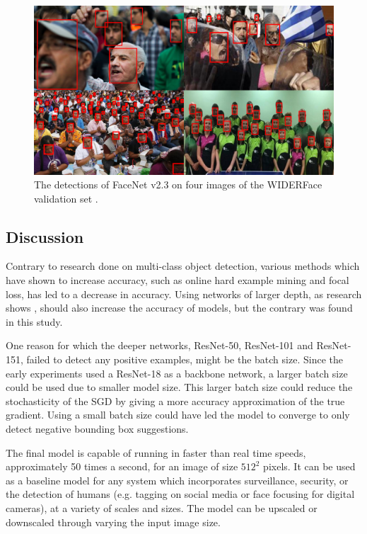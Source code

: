 \documentclass[a4paper, twoside]{article}
\begin{document}
\begin{figure}[h]
\begin{center}
    \includegraphics[width=16cm]{figfacedetection.png}\caption{The detections of FaceNet v2.3 on four images of the WIDERFace validation set \cite{WIDERFace}.} \label{figwiderfaceval}
\end{center}
\end{figure}

\subsection{Discussion}
Contrary to research done on multi-class object detection, various methods which have shown to increase accuracy, such as online hard example mining and focal loss, has led to a decrease in accuracy. Using networks of larger depth, as research shows \cite{retinanet} \cite{resnet}, should also increase the accuracy of models, but the contrary was found in this study.

One reason for which the deeper networks, ResNet-50, ResNet-101 and ResNet-151, failed to detect any positive examples, might be the batch size. Since the early experiments used a ResNet-18 as a backbone network, a larger batch size could be used due to smaller model size. This larger batch size could reduce the stochasticity of the SGD by giving a more accuracy approximation of the true gradient. Using a small batch size could have led the model to converge to only detect negative bounding box suggestions.

The final model is capable of running in faster than real time speeds, approximately 50 times a second, for an image of size $512^2$ pixels. It can be used as a baseline model for any system which incorporates surveillance, security, or the detection of humans (e.g. tagging on social media or face focusing for digital cameras), at a variety of scales and sizes. The model can be upscaled or downscaled through varying the input image size.
\end{document}
